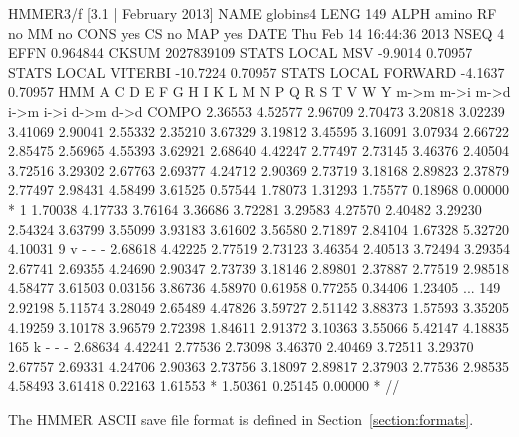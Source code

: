 \begin{samepage}
\begin{sreoutput}
HMMER3/f [3.1 | February 2013]
NAME  globins4
LENG  149
ALPH  amino
RF    no
MM    no
CONS  yes
CS    no
MAP   yes
DATE  Thu Feb 14 16:44:36 2013
NSEQ  4
EFFN  0.964844
CKSUM 2027839109
STATS LOCAL MSV       -9.9014  0.70957
STATS LOCAL VITERBI  -10.7224  0.70957
STATS LOCAL FORWARD   -4.1637  0.70957
HMM          A        C        D        E        F        G        H        I        K        L        M        N        P        Q        R        S        T        V        W        Y
            m->m     m->i     m->d     i->m     i->i     d->m     d->d
  COMPO   2.36553  4.52577  2.96709  2.70473  3.20818  3.02239  3.41069  2.90041  2.55332  2.35210  3.67329  3.19812  3.45595  3.16091  3.07934  2.66722  2.85475  2.56965  4.55393  3.62921
          2.68640  4.42247  2.77497  2.73145  3.46376  2.40504  3.72516  3.29302  2.67763  2.69377  4.24712  2.90369  2.73719  3.18168  2.89823  2.37879  2.77497  2.98431  4.58499  3.61525
          0.57544  1.78073  1.31293  1.75577  0.18968  0.00000        *
      1   1.70038  4.17733  3.76164  3.36686  3.72281  3.29583  4.27570  2.40482  3.29230  2.54324  3.63799  3.55099  3.93183  3.61602  3.56580  2.71897  2.84104  1.67328  5.32720  4.10031      9 v - - -
          2.68618  4.42225  2.77519  2.73123  3.46354  2.40513  3.72494  3.29354  2.67741  2.69355  4.24690  2.90347  2.73739  3.18146  2.89801  2.37887  2.77519  2.98518  4.58477  3.61503
          0.03156  3.86736  4.58970  0.61958  0.77255  0.34406  1.23405
...
    149   2.92198  5.11574  3.28049  2.65489  4.47826  3.59727  2.51142  3.88373  1.57593  3.35205  4.19259  3.10178  3.96579  2.72398  1.84611  2.91372  3.10363  3.55066  5.42147  4.18835    165 k - - -
          2.68634  4.42241  2.77536  2.73098  3.46370  2.40469  3.72511  3.29370  2.67757  2.69331  4.24706  2.90363  2.73756  3.18097  2.89817  2.37903  2.77536  2.98535  4.58493  3.61418
          0.22163  1.61553        *  1.50361  0.25145  0.00000        *
//
\end{sreoutput}
\end{samepage}

The HMMER ASCII save file format is defined in
Section~\ref{section:formats}.


